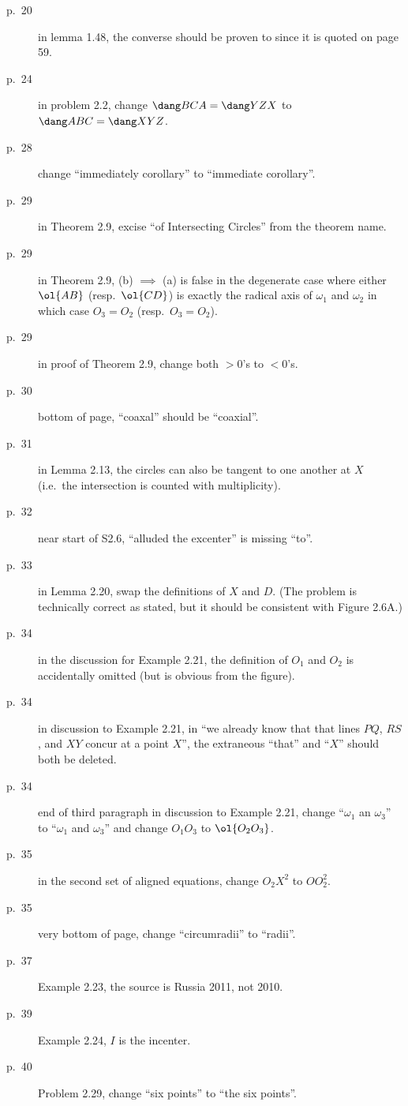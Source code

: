 \documentclass[11pt]{scrartcl}
\begin{document}
\begin{description}
\item[p.\  20] in lemma 1.48, the converse should be proven to since it is quoted on page 59.
\item[p.\  24] in problem 2.2, change $\dang BCA = \dang YZX$
  to $\dang ABC = \dang XYZ$.
\item[p.\  28] change ``immediately corollary'' to ``immediate corollary''.
\item[p.\  29] in Theorem 2.9, excise ``of Intersecting Circles'' from the theorem name.
\item[p.\  29] in Theorem 2.9, (b) $\implies$ (a) is false in the degenerate case
  where either $\ol{AB}$ (resp.\ $\ol{CD}$) is exactly the radical axis of $\omega_1$ and $\omega_2$
  in which case $O_3 = O_2$ (resp.\ $O_3 = O_2$).
\item[p.\  29] in proof of Theorem 2.9, change both $>0$'s to $<0$'s.
\item[p.\  30] bottom of page, ``coaxal'' should be ``coaxial''.
\item[p.\  31] in Lemma 2.13, the circles can also be tangent
  to one another at $X$ (i.e.\ the intersection is counted with multiplicity).
\item[p.\  32] near start of S2.6, ``alluded the excenter'' is missing ``to''.
\item[p.\  33] in Lemma 2.20, swap the definitions of $X$ and $D$.
  (The problem is technically correct as stated,
  but it should be consistent with Figure 2.6A.)
\item[p.\  34] in the discussion for Example 2.21,
  the definition of $O_1$ and $O_2$ is accidentally omitted (but is obvious from the figure).
\item[p.\  34] in discussion to Example 2.21, in
  ``we already know that that lines $PQ$, $RS$, and $XY$ concur at a point $X$'',
  the extraneous ``that'' and ``$X$'' should both be deleted.
\item[p.\  34] end of third paragraph in discussion to Example 2.21,
  change ``$\omega_1$ an $\omega_3$'' to ``$\omega_1$ and $\omega_3$''
  and change $O_1O_3$ to $\ol{O_2O_3}$.
\item[p.\  35] in the second set of aligned equations,
  change $O_2X^2$ to $OO_2^2$.
\item[p.\  35] very bottom of page, change ``circumradii'' to ``radii''.
\item[p.\  37] Example 2.23, the source is Russia 2011, not 2010.
\item[p.\  39] Example 2.24, $I$ is the incenter.
\item[p.\  40] Problem 2.29, change ``six points'' to ``the six points''.

\end{description}
\end{document}
